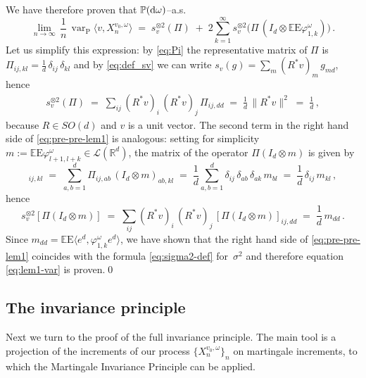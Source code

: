 \documentclass[a4paper,reqno,11pt]{amsart}
\numberwithin{equation}{section}
\newcommand{\bbE}{{\ensuremath{\mathbb E}} }
\newcommand{\bbP}{{\ensuremath{\mathbb P}} }
\newcommand{\cL}{{\ensuremath{\mathcal L}} }
\newcommand{\gd}{\delta}
\newcommand{\gs}{\sigma}
\newcommand{\go}{\omega}
\newcommand{\dd}{\text{\rm d}}             %
\newcommand{\R}{\mathbb{R}}
\DeclareMathOperator{\var}{var}
\def\bP{\ensuremath{\bs{\mathrm{P}}}}
\def\bE{\ensuremath{\bs{\mathrm{E}}}}
\def\bs{\boldsymbol}
\begin{document}
We have therefore proven that $\bbP(\dd \go)$--a.s. 
\begin{equation}
\label{eq:pre-pre-lem1}
\lim_{n \to \infty} \, \frac 1n \,
\var_{\bP} \langle v, X_n^{v_0, \go}\rangle \;=\;
s_v^{\otimes 2} (\Pi) \;+\;  2 \sum_{k=1}^\infty
s_v^{\otimes 2} \big( \Pi \, (I_d \otimes \bbE  \bE \varphi^\omega_{1,k}) \big) \,.
\end{equation} 
Let us simplify this expression: by
\eqref{eq:Pi} the representative matrix of $\Pi$ 
is $\Pi_{ij, kl} = \frac 1d \, \gd_{ij} \, \gd_{kl}$ and
by \eqref{eq:def_sv} we can write $s_v(g) = \sum_m (R^*v)_m \, g_{md}$, hence
\begin{align} \label{eq:asd}
s_v^{\otimes 2} (\Pi)  \;=\;
\sum_{ij} (R^*v)_{i} \, (R^*v)_{j} \, \Pi_{ij, dd} \;=\;
\frac 1d \, \| R^*v\|^2 \;=\; \frac 1d\,,
\end{align}
because $R \in SO(d)$ and $v$ is a unit vector.
The second term in the right hand side of \eqref{eq:pre-pre-lem1} is
analogous: setting for simplicity $m := \bbE  \bE \varphi^\omega_{l+1,l+k}
\in \cL(\R^d)$, the matrix of the operator $\Pi(I_d \otimes m)$ is given by
\begin{equation}
	[\Pi(I_d \otimes m)]_{ij, kl} \;=\; \sum_{a,b = 1}^d
	\Pi_{ij, ab} \, (I_d \otimes m)_{ab, kl} \;=\;
	\frac 1d \sum_{a,b = 1}^d \gd_{ij} \, \gd_{ab} \, \gd_{ak}
	\, m_{bl} \;=\; \frac 1d \, \gd_{ij} \, m_{kl} \,,
\end{equation}
hence
\begin{equation} \label{eq:asd2}
s_v ^{\otimes 2}[ \Pi (I_d \otimes m) ]
\;=\; \sum_{ij} (R^*v)_{i} \, (R^*v)_{j} \, [\Pi(I_d \otimes m)]_{ij, dd}
\;=\; \frac 1d \, m_{dd}\,.
\end{equation}
Since $m_{dd} = \bbE  \bE \langle e^d, \varphi^\omega_{1,k} e^d \rangle$,
we have shown that the right hand side of \eqref{eq:pre-pre-lem1} coincides with
the formula \eqref{eq:sigma2-def} for~$\gs^2$ and therefore
equation \eqref{eq:lem1-var} is proven.\qed

\smallskip


\smallskip

\subsection{The invariance principle}
\label{sec:inv_pr}

Next we turn to the proof of the full invariance principle.
The main tool is a projection of the increments
of our process $\{X^{v_0, \go}_n\}_n$ 
on martingale increments, to which the Martingale Invariance Principle can be applied.
\end{document}
